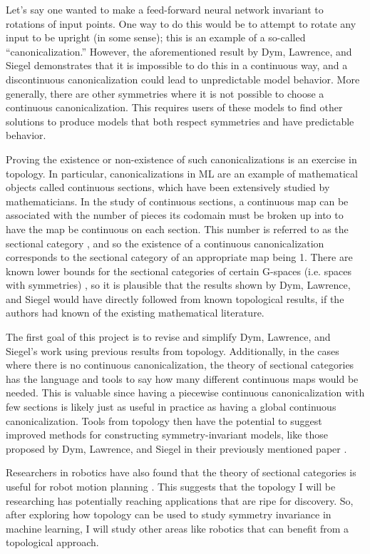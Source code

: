 \documentclass[12pt]{article}
\begin{document}
Let's say one wanted to make a feed-forward neural network invariant to rotations of input points.
One way to do this would be to attempt to rotate any input to be upright (in some sense); this is an example of a so-called ``canonicalization.''
However, the aforementioned result by Dym, Lawrence, and Siegel demonstrates that it is impossible to do this in a continuous way, and a discontinuous canonicalization could lead to unpredictable model behavior.
More generally, there are other symmetries where it is not possible to choose a continuous canonicalization.
This requires users of these models to find other solutions to produce models that both respect symmetries and have predictable behavior.

Proving the existence or non-existence of such canonicalizations is an exercise in topology.
In particular, canonicalizations in ML are an example of mathematical objects called continuous sections, which have been extensively studied by mathematicians.
In the study of continuous sections, a continuous map can be associated with the number of pieces its codomain must be broken up into to have the map be continuous on each section.
This number is referred to as the sectional category \cite{colman2013equivariant}, and so the existence of a continuous canonicalization corresponds to the sectional category of an appropriate map being 1.
There are known lower bounds for the sectional categories of certain G-spaces (i.e. spaces with symmetries) \cite{colman2013equivariant}, so it is plausible that the results shown by Dym, Lawrence, and Siegel would have directly followed from known topological results, if the authors had  known of the existing mathematical literature.

The first goal of this project is to revise and simplify Dym, Lawrence, and Siegel's work using previous results from topology.
Additionally, in the cases where there is no continuous canonicalization, the theory of sectional categories has the language and tools to say how many different continuous maps would be needed.
This is valuable since having a piecewise continuous canonicalization with few sections is likely just as useful in practice as having a global continuous canonicalization.
Tools from topology then have the potential to suggest improved methods for constructing symmetry-invariant models, like those proposed by Dym, Lawrence, and Siegel in their previously mentioned paper \cite{dym2024equivariant}.

Researchers in robotics have also found that the theory of sectional categories is useful for robot motion planning \cite{farber2006topology}.
This suggests that the topology I will be researching has potentially reaching applications that are ripe for discovery.
So, after exploring how topology can be used to study symmetry invariance in machine learning, I will study other areas like robotics that can benefit from a topological approach.
\end{document}
